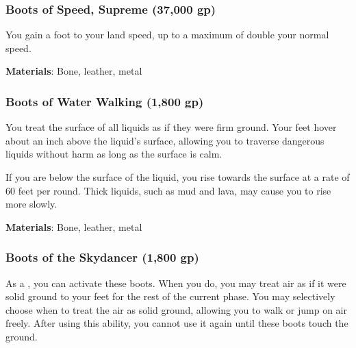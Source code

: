 \lowercase{\hypertarget{item:Boots of Speed, Supreme}{}}\label{item:Boots of Speed, Supreme}
\hypertarget{item:Boots of Speed, Supreme}{\subsubsection{Boots of Speed, Supreme\hfill{} (37,000 gp)}}

You gain a  foot  to your land speed, up to a maximum of double your normal speed.



\vspace{0.25em}
\textbf{Materials}: Bone, leather, metal


\lowercase{\hypertarget{item:Boots of Water Walking}{}}\label{item:Boots of Water Walking}
\hypertarget{item:Boots of Water Walking}{\subsubsection{Boots of Water Walking\hfill{} (1,800 gp)}}

You treat the surface of all liquids as if they were firm ground.
Your feet hover about an inch above the liquid's surface, allowing you to traverse dangerous liquids without harm as long as the surface is calm.

If you are below the surface of the liquid, you rise towards the surface at a rate of 60 feet per round.
Thick liquids, such as mud and lava, may cause you to rise more slowly.



\vspace{0.25em}
\textbf{Materials}: Bone, leather, metal


\lowercase{\hypertarget{item:Boots of the Skydancer}{}}\label{item:Boots of the Skydancer}
\hypertarget{item:Boots of the Skydancer}{\subsubsection{Boots of the Skydancer\hfill{} (1,800 gp)}}

As a , you can activate these boots.
When you do, you may treat air as if it were solid ground to your feet for the rest of the current phase.
You may selectively choose when to treat the air as solid ground, allowing you to walk or jump on air freely.
After using this ability, you cannot use it again until these boots touch the ground.



